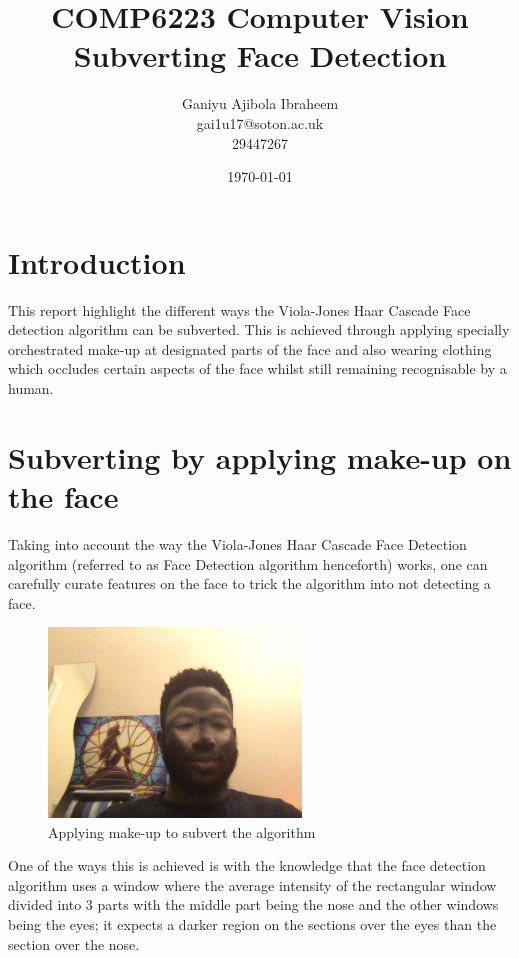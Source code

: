 \documentclass[a4paper,12pt]{article}
\begin{document}
	
\begin{titlepage}
	\title{
		COMP6223 Computer Vision \\
		\large Subverting Face Detection
	}
	\date{\today}
	\author{
		Ganiyu Ajibola Ibraheem \\
		\large gai1u17@soton.ac.uk \\
			29447267
	}
\end{titlepage}

\maketitle
\newpage
{}
\tableofcontents
\newpage
\listoffigures

\listoflistings
\newpage
{}


\section{Introduction}
This report highlight the different ways the Viola-Jones Haar Cascade Face detection algorithm can be subverted. This is achieved through applying specially orchestrated make-up at designated parts of the face and also wearing clothing which occludes certain aspects of the face whilst still remaining recognisable by a human.

\section{Subverting by applying make-up on the face}
Taking into account the way the Viola-Jones Haar Cascade Face Detection algorithm (referred to as Face Detection algorithm henceforth) works, one can carefully curate features on the face to trick the algorithm into not detecting a face. \\
	\begin{figure} 
		\centering
		\includegraphics[width=0.6\textwidth]{images/make_up}
		\caption{Applying make-up to subvert the algorithm}
		\label{fig:make_up}
	\end{figure}
One of the ways this is achieved is with the knowledge that the face detection algorithm uses a window where the average intensity of the rectangular window divided into 3 parts with the middle part being the nose and the other windows being the eyes; it expects a darker region on the sections over the eyes than the section over the nose. \\
	
\end{document}
